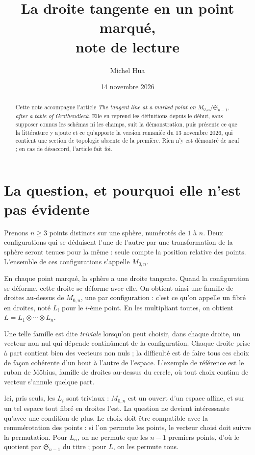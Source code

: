 \documentclass[11pt,a4paper]{amsart}
\title[Note de lecture : la droite tangente en un point marqué]{La droite tangente en un point marqué,\\ note de lecture}
\author{Michel Hua}
\date{14 novembre 2026}
\theoremstyle{definition}
\theoremstyle{plain}
\theoremstyle{remark}
\newcommand{\M}{M_{0,n}}
\newcommand{\Sn}{\mathfrak S}
\begin{document}
\maketitle

\begin{abstract}
Cette note accompagne l'article \emph{The tangent line at a marked point on $M_{0,n}/\Sn_{n-1}$, after a table of Grothendieck}. Elle en reprend les définitions depuis le début, sans supposer connus les schémas ni les champs, suit la démonstration, puis présente ce que la littérature y ajoute et ce qu'apporte la version remaniée du 13 novembre 2026, qui contient une section de topologie absente de la première. Rien n'y est démontré de neuf ; en cas de désaccord, l'article fait foi.
\end{abstract}

\section{La question, et pourquoi elle n'est pas évidente}

Prenons $n \ge 3$ points distincts sur une sphère, numérotés de $1$ à $n$. Deux configurations qui se déduisent l'une de l'autre par une transformation de la sphère seront tenues pour la même : seule compte la position relative des points. L'ensemble de ces configurations s'appelle $\M$.

En chaque point marqué, la sphère a une droite tangente. Quand la configuration se déforme, cette droite se déforme avec elle. On obtient ainsi une famille de droites au-dessus de $\M$, une par configuration : c'est ce qu'on appelle un fibré en droites, noté $L_i$ pour le $i$-ème point. En les multipliant toutes, on obtient $L = L_1 \otimes \cdots \otimes L_n$.

Une telle famille est dite \emph{triviale} lorsqu'on peut choisir, dans chaque droite, un vecteur non nul qui dépende continûment de la configuration. Chaque droite prise à part contient bien des vecteurs non nuls ; la difficulté est de faire tous ces choix de façon cohérente d'un bout à l'autre de l'espace. L'exemple de référence est le ruban de Möbius, famille de droites au-dessus du cercle, où tout choix continu de vecteur s'annule quelque part.

Ici, pris seuls, les $L_i$ sont triviaux : $\M$ est un ouvert d'un espace affine, et sur un tel espace tout fibré en droites l'est. La question ne devient intéressante qu'avec une condition de plus. Le choix doit être compatible avec la renumérotation des points : si l'on permute les points, le vecteur choisi doit suivre la permutation. Pour $L_n$, on ne permute que les $n-1$ premiers points, d'où le quotient par $\Sn_{n-1}$ du titre ; pour $L$, on les permute tous.
\end{document}
